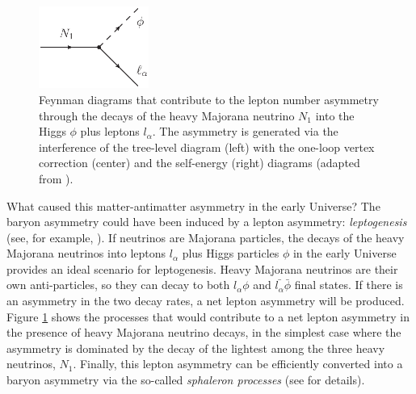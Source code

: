 \begin{figure}[t!b!]
\begin{center}
\includegraphics[width=0.32\textwidth]{img/leptog1.eps} \hfill
{} \hfill
{}
\end{center}
\caption{Feynman diagrams that contribute to the lepton number asymmetry through the decays of the heavy Majorana neutrino $N_1$ into the Higgs $\phi$ plus leptons $l_{\alpha}$. The asymmetry is generated via the interference of the tree-level diagram (left) with the one-loop vertex correction (center) and the self-energy (right) diagrams (adapted from \cite{Chen:2007fv}).} \label{fig:leptogenesis}
\end{figure}

What caused this matter-antimatter asymmetry in the early Universe? The baryon asymmetry could have been induced by a lepton asymmetry: \emph{leptogenesis} (see, for example, \cite{Chen:2007fv,Davidson:2008bu}). If neutrinos are Majorana particles, the decays of the heavy Majorana neutrinos into leptons $l_{\alpha}$ plus Higgs particles $\phi$ in the early Universe provides an ideal scenario for leptogenesis. Heavy Majorana neutrinos are their own anti-particles, so they can decay to both $l_{\alpha}\phi$ and $\bar{l_{\alpha}}\bar{\phi}$ final states. If there is an asymmetry in the two decay rates, a net lepton asymmetry will be produced. Figure \ref{fig:leptogenesis} shows the processes that would contribute to a net lepton asymmetry in the presence of heavy Majorana neutrino decays, in the simplest case where the asymmetry is dominated by the decay of the lightest among the three heavy neutrinos, $N_1$. Finally, this lepton asymmetry can be efficiently converted into a baryon asymmetry via the so-called \emph{sphaleron processes} (see \cite{Chen:2007fv,Davidson:2008bu} for details).

